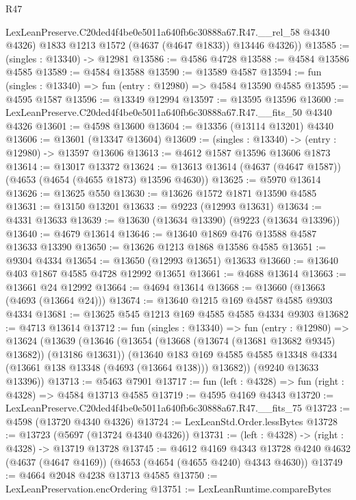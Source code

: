 \begin{lexlean}{R47}
\begin{coremodule}
        LexLeanPreserve.C20ded4f4be0e5011a640fb6c30888a67.R47.__rel_58 @4340 @4326)
        @1833
        @1213
        @1572
        (@4637 (@4647 @1833))
        @13446
        @4326))
@13585 := (singles : @13340) -> @12981
@13586 := @4586 @4728
@13588 := @4584 @13586 @4585
@13589 := @4584 @13588
@13590 := @13589 @4587
@13594 := fun (singles : @13340) => fun (entry : @12980) => @4584 @13590 @4585
@13595 := @4595 @1587
@13596 := @13349 @12994
@13597 := @13595 @13596
@13600 := LexLeanPreserve.C20ded4f4be0e5011a640fb6c30888a67.R47.__fits_50 @4340 @4326
@13601 := @4598 @13600
@13604 := @13356 (@13114 @13201) @4340
@13606 := @13601 (@13347 @13604)
@13609 := (singles : @13340) -> (entry : @12980) -> @13597 @13606
@13613 := @4612 @1587 @13596 @13606 @1873
@13614 := @13017 @13372
@13624 := @13613 @13614 (@4637 (@4647 @1587)) (@4653 (@4654 (@4655 @1873) @13596 @4630))
@13625 := @5970 @13614
@13626 := @13625 @550
@13630 := @13626 @1572 @1871 @13590 @4585
@13631 := @13150 @13201
@13633 := @9223 (@12993 @13631)
@13634 := @4331 @13633
@13639 := @13630 (@13634 @13390) (@9223 (@13634 @13396))
@13640 := @4679 @13614
@13646 := @13640 @1869 @476 @13588 @4587 @13633 @13390
@13650 := @13626 @1213 @1868 @13586 @4585
@13651 := @9304 @4334
@13654 := @13650 (@12993 @13651) @13633
@13660 := @13640 @403 @1867 @4585 @4728 @12992 @13651
@13661 := @4688 @13614
@13663 := @13661 @24 @12992
@13664 := @4694 @13614
@13668 := @13660 (@13663 (@4693 (@13664 @24)))
@13674 := @13640 @1215 @169 @4587 @4585 @9303 @4334
@13681 := @13625 @545 @1213 @169 @4585 @4585 @4334 @9303
@13682 := @4713 @13614
@13712 := fun (singles : @13340) =>
  fun (entry : @12980) =>
  @13624
    (@13639
      (@13646
        (@13654 (@13668 (@13674 (@13681 @13682 @9345) @13682)) (@13186 @13631))
        (@13640
          @183
          @169
          @4585
          @4585
          @13348
          @4334
          (@13661 @138 @13348 (@4693 (@13664 @138)))
          @13682))
      (@9240 @13633 @13396))
@13713 := @5463 @7901
@13717 := fun (left : @4328) => fun (right : @4328) => @4584 @13713 @4585
@13719 := @4595 @4169 @4343
@13720 := LexLeanPreserve.C20ded4f4be0e5011a640fb6c30888a67.R47.__fits_75
@13723 := @4598 (@13720 @4340 @4326)
@13724 := LexLeanStd.Order.lessBytes
@13728 := @13723 (@5697 (@13724 @4340 @4326))
@13731 := (left : @4328) -> (right : @4328) -> @13719 @13728
@13745 := @4612
    @4169
    @4343
    @13728
    @4240
    @4632
    (@4637 (@4647 @4169))
    (@4653 (@4654 (@4655 @4240) @4343 @4630))
@13749 := @4664 @2048 @4238 @13713 @4585
@13750 := LexLeanPreservation.encOrdering
@13751 := LexLeanRuntime.compareBytes

\end{coremodule}
\end{lexlean}
